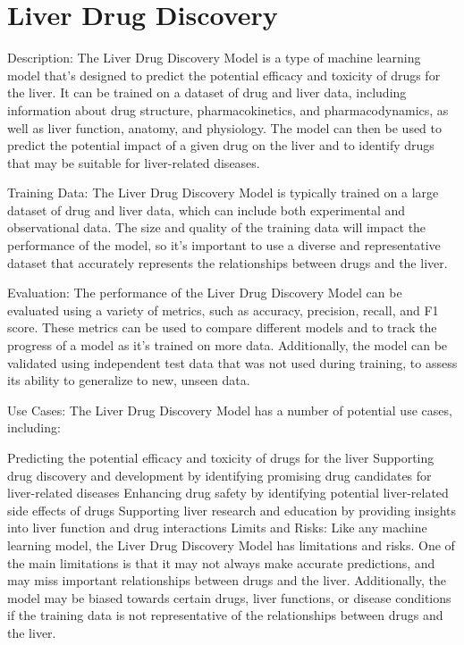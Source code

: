 \section{Liver Drug Discovery}

Description:
The Liver Drug Discovery Model is a type of machine learning model that's designed to predict the potential efficacy and toxicity of drugs for the liver. It can be trained on a dataset of drug and liver data, including information about drug structure, pharmacokinetics, and pharmacodynamics, as well as liver function, anatomy, and physiology. The model can then be used to predict the potential impact of a given drug on the liver and to identify drugs that may be suitable for liver-related diseases.

Training Data:
The Liver Drug Discovery Model is typically trained on a large dataset of drug and liver data, which can include both experimental and observational data. The size and quality of the training data will impact the performance of the model, so it's important to use a diverse and representative dataset that accurately represents the relationships between drugs and the liver.

Evaluation:
The performance of the Liver Drug Discovery Model can be evaluated using a variety of metrics, such as accuracy, precision, recall, and F1 score. These metrics can be used to compare different models and to track the progress of a model as it's trained on more data. Additionally, the model can be validated using independent test data that was not used during training, to assess its ability to generalize to new, unseen data.

Use Cases:
The Liver Drug Discovery Model has a number of potential use cases, including:

Predicting the potential efficacy and toxicity of drugs for the liver
Supporting drug discovery and development by identifying promising drug candidates for liver-related diseases
Enhancing drug safety by identifying potential liver-related side effects of drugs
Supporting liver research and education by providing insights into liver function and drug interactions
Limits and Risks:
Like any machine learning model, the Liver Drug Discovery Model has limitations and risks. One of the main limitations is that it may not always make accurate predictions, and may miss important relationships between drugs and the liver. Additionally, the model may be biased towards certain drugs, liver functions, or disease conditions if the training data is not representative of the relationships between drugs and the liver.

